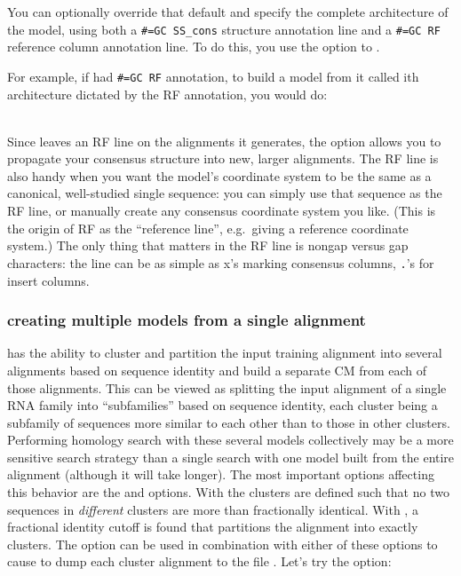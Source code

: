 You can optionally override that default and specify the complete
architecture of the model, using both a {\small\verb+#=GC SS_cons+}
structure annotation line and a {\small\verb+#=GC RF+} reference
column annotation line.  To do this, you use the  option to
.

For example, if  had {\small\verb+#=GC RF+}
annotation, to build a model from it called  
ith architecture dictated by the RF annotation, you
would do:

\\

Since  leaves an RF line on the alignments it generates,
the  option allows you to propagate your consensus
structure into new, larger alignments. The RF line is also handy when
you want the model's coordinate system to be the same as a canonical,
well-studied single sequence: you can simply use that sequence as the
RF line, or manually create any consensus coordinate system you like.
(This is the origin of RF as the ``reference line'', e.g.\ giving a
reference coordinate system.) The only thing that matters in the RF
line is nongap versus gap characters: the line can be as simple as x's
marking consensus columns, \verb+.+'s for insert columns.

\subsubsection{creating multiple models from a single alignment}
 has the ability to cluster and partition the input training
alignment into several alignments based on sequence identity and build
a separate CM from each of those alignments. This can be viewed as splitting
the input alignment of a single RNA family into ``subfamilies'' based on
sequence identity, each cluster being a subfamily of sequences more
similar to each other than to those in other clusters.
Performing homology search with these several models
collectively may be a more sensitive search strategy than a single
search with one model built from the entire alignment (although it
will take longer). The most important options affecting this behavior
are the  and  options. With
 the clusters are defined such that no two
sequences in \emph{different} clusters are more than 
fractionally identical. With , a fractional identity
cutoff is found that partitions the alignment into exactly 
clusters. The  option can be used in combination
with either of these options to cause  to dump each
cluster alignment to the file . Let's try the 
 option: 

